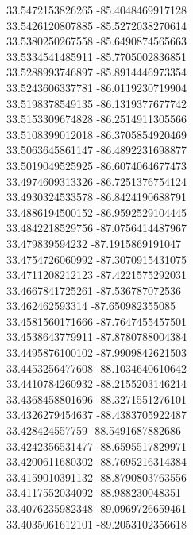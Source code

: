 {33.5472153826265	-85.4048469917128\\
33.5426120807885	-85.5272038270614\\
33.5380250267558	-85.6490874565663\\
33.5334541485911	-85.7705002836851\\
33.5288993746897	-85.8914446973354\\
33.5243606337781	-86.0119230719904\\
33.5198378549135	-86.1319377677742\\
33.5153309674828	-86.2514911305566\\
33.5108399012018	-86.3705854920469\\
33.5063645861147	-86.4892231698877\\
33.5019049525925	-86.6074064677473\\
33.4974609313326	-86.7251376754124\\
33.4930324533578	-86.8424190688791\\
33.4886194500152	-86.9592529104445\\
33.4842218529756	-87.0756414487967\\
33.479839594232	-87.1915869191047\\
33.4754726060992	-87.3070915431075\\
33.4711208212123	-87.4221575292031\\
33.4667841725261	-87.536787072536\\
33.462462593314	-87.650982355085\\
33.4581560171666	-87.7647455457501\\
33.4538643779911	-87.8780788004384\\
33.4495876100102	-87.9909842621503\\
33.4453256477608	-88.1034640610642\\
33.4410784260932	-88.2155203146214\\
33.4368458801696	-88.3271551276101\\
33.4326279454637	-88.4383705922487\\
33.428424557759	-88.5491687882686\\
33.4242356531477	-88.6595517829971\\
33.4200611680302	-88.7695216314384\\
33.4159010391132	-88.8790803763556\\
33.4117552034092	-88.988230048351\\
33.4076235982348	-89.0969726659461\\
33.4035061612101	-89.2053102356618\\
}
